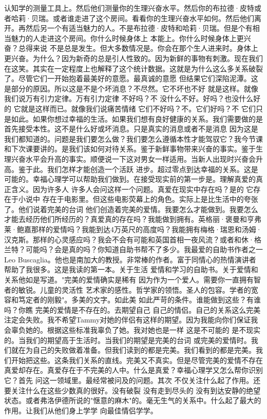 认知学的测量工具上。然后他们测量你的生理兴奋水平。然后你的布拉德·皮特或者哈莉·贝瑞。或者谁走进了这个房间。看看你的生理兴奋水平如何。然后他们离开。再然后另一个有适当魅力的人。不是布拉德·皮特和哈莉·贝瑞。但是个有相当魅力的人走进这个房间。你什么时候身体上 本能上。你什么时候身体上更兴奋？总得来说 不是总是发生。但大多数情况是。你会在那个生人进来时。身体上更兴奋。为什么？因为新奇的总是引人性致的。因为新鲜的事物有刺激。现在我们在这笑。其实在一定程度上也解释了这个统计数据。这就是为什么这么多关系破裂了。尽管它们一开始抱着最美好的意愿。最真诚的意愿 但结果它们深陷泥潭。这是部分的原因。所以这是不是个坏消息？不尽然。它不坏也不好 就是这样。就像我们说万有引力定律。万有引力定律 不好吗？不 没什么不好。好吗？也没什么好的 它就是这样而已。就像我们说痛苦情绪 它们不好吗？不。它们好吗？不 它们只是如此。如果你想过幸福的生活。如果我们想有良好健康的关系。我们需要做的是首先接受本性。这不是什么好或坏消息。只是真实的消息或者不是消息 因为这是我们都知道的。问题是我们要怎么做？我们要怎么遵循本性才能驾驭它？我今节课和下次课要讲的。是我们该如何对待关系。鉴于新鲜事物带来兴奋的事实。鉴于生理兴奋水平会升高的事实。顺便说一下这对男女一样适用。当新人出现时兴奋会升高。鉴于此。我们怎样才能创造一个活跃 进步。超过零点到达幸福的关系。这是可能的。幸福心理学可以帮助我们做到。在接受现实前的第一步是。理解真爱的真正含义。因为许多人 许多人会问这样一个问题。真爱在现实中存在吗？是的 它存在于小说中 存在于电影里。但这些电影荧幕上的角色。实际上是比生活中的夸张了。他们说着完美的台词 他们创造着完美的爱情。我要怎么才能做到。我要怎么才能去经历他们所经历的？真爱真的存在吗？我能做到拥有。英格丽·褒曼和亨弗莱·鲍嘉那样的爱情吗？我能到达4万英尺的高度吗？我能拥有梅格·瑞恩和汤姆·汉克斯。那样的心灵感应吗？我会不会有可能和英国首相一夜风流？或者和休·格兰特？可能吗？会是真的吗？你知道自助书帮不了多少。我最爱的自助书作者之一 Leo Buscaglia。他也是南加大的教授。非常棒的作者。富于同情心的热情演讲者 帮助了我很多。这是我读的第一本。关于生活 爱情和学习的自助书。关于爱情和关系他如是写道。"完美的爱情确实是稀有 因为作为一个爱人。需要你一直拥有智者的敏锐。儿童的灵活性 艺术家的感性。哲学家的领悟。圣人的包容。学者的宽容和笃定者的刚毅"。多美的文字。如此美 如此严苛的条件。谁能做到这些？有谁吗？你瞧 完美的爱情是不存在的。去期望自己 自己的情侣。自己的关系这么完美 注定会失败。我不希望Tammy对她的伴侣有这样的期望。因为我能向你们保证我会辜负她的。根据这些标准我辜负了她。我对她也是一样 这是不可能的 是不现实的。当我们的期望高于生活时。当我们的期望是完美的台词 或完美的爱情时。我们就在为自己的失败做着准备。但我们读到的都是完美。我们看到的都是完美。我们开始把这些。这条我们关系的直线。完美又不真实。但是尽管完美的爱情不存在 真爱却存在。真爱存在于不完美的人中。什么是真爱？幸福心理学又怎么帮你识别它？首先 问这一领域里。最经常被问及的问题。其次 不仅关注什么起了作用。还要关注什么在这些少数真的很好。没有破裂 没有走到尽头的 没有到达安静的绝望状态。或者弗洛伊德所说的"惬意的麻木"的。毫无生气的关系中。什么起了最大的作用。让我们从他们身上学学 向最佳情侣学学。 

